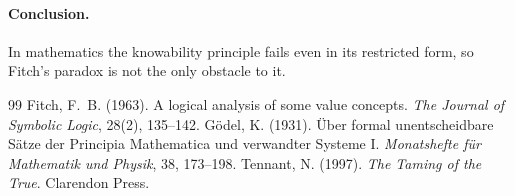 \documentclass{situationist-preprint}
\begin{document}
\paragraph{Conclusion.} In mathematics the knowability principle fails even in its restricted form, so Fitch's paradox is not the only obstacle to it.

\begin{thebibliography}{99}\small
{} Fitch, F.~B. (1963). A logical analysis of some value concepts. \emph{The Journal of Symbolic Logic}, 28(2), 135--142.
 G{\"o}del, K. (1931). {\"U}ber formal unentscheidbare S{\"a}tze der Principia Mathematica und verwandter Systeme I. \emph{Monatshefte f{\"u}r Mathematik und Physik}, 38, 173--198.
 Tennant, N. (1997). \emph{The Taming of the True}. Clarendon Press.
\end{thebibliography}
\end{document}
